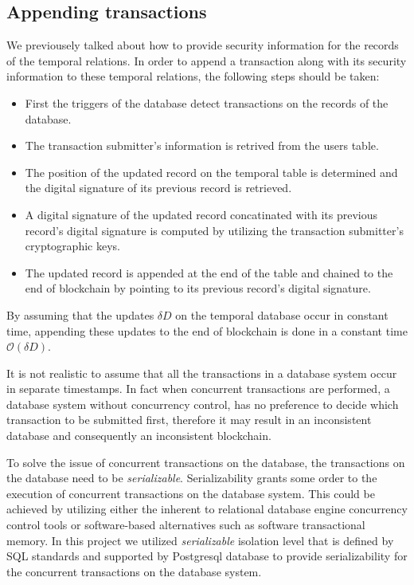 		\subsection{Appending transactions} \label{ch:append_of_transactions}
		We previousely talked about how to provide security information for the records of the temporal relations. In order to append a transaction along with its security information to these temporal relations, the following steps should be taken:
		\begin {itemize}
			\item First the triggers of the database detect transactions on the records of the database.
			\item The transaction submitter's information is retrived from the users table.
			\item The position of the updated record on the temporal table is determined and the digital signature of its previous record is retrieved.
			\item A digital signature of the updated record concatinated with its previous record's digital signature is computed by utilizing the transaction submitter's cryptographic keys.
			\item The updated record is appended at the end of the table and chained to the end of blockchain by pointing to its previous record's digital signature.
		\end{itemize}
		
		\begin{prop} 
			By assuming that the updates $\delta D$ on the temporal database occur in constant time, appending these updates to the end of blockchain is done in a constant time $\mathcal{O}(\delta D)$.
		\end{prop}

		It is not realistic to assume that all the transactions in a database system occur in separate timestamps. In fact when concurrent transactions are performed, a database system without concurrency control, has no preference to decide which transaction to be submitted first, therefore it may result in an inconsistent database and consequently an inconsistent blockchain. 

		To solve the issue of concurrent transactions on the database, the transactions on the database need to be {\it serializable}. Serializability grants some order to the execution of concurrent transactions on the database system. This could be achieved by utilizing either the inherent to relational database engine concurrency control tools or software-based alternatives such as software transactional memory. In this project we utilized {\it serializable} isolation level that is defined by SQL standards and supported by Postgresql database to provide serializability for the concurrent transactions on the database system.



